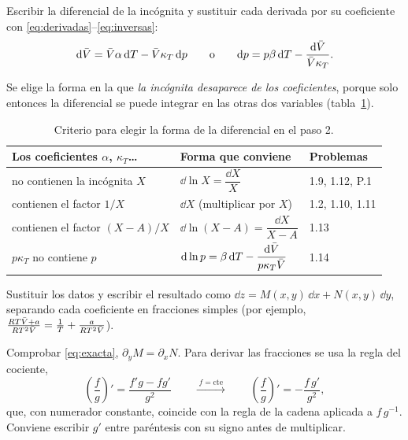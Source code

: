  Escribir la diferencial de la incógnita y sustituir cada derivada por
su coeficiente con \eqref{eq:derivadas}--\eqref{eq:inversas}:
\[
  \mathrm{d}\bar{V}=\bar{V}\alpha\,\mathrm{d} T-\bar{V}\kappa_T\,\mathrm{d} p\qquad\text{o}\qquad
  \mathrm{d} p=p\beta\,\mathrm{d} T-\frac{\mathrm{d}\bar{V}}{\bar{V}\kappa_T}.
\]

 Se elige la forma en la que \emph{la incógnita desaparece de los
coeficientes}, porque solo entonces la diferencial se puede integrar en las otras dos variables
(tabla~\ref{tab:forma}).

\begin{table}[htbp]
\centering
\caption{Criterio para elegir la forma de la diferencial en el paso 2.}
\label{tab:forma}
\small
\renewcommand{\arraystretch}{1.6}
\begin{tabular}{lll}
\toprule
Los coeficientes $\alpha$, $\kappa_T$\dots & Forma que conviene & Problemas\\
\midrule
no contienen la incógnita $X$ & $\dd\ln X=\dfrac{\dd X}{X}$ & 1.9, 1.12, P.1\\[4pt]
contienen el factor $1/X$ & $\dd X$ (multiplicar por $X$) & 1.2, 1.10, 1.11\\[4pt]
contienen el factor $(X-A)/X$ & $\dd\ln(X-A)=\dfrac{\dd X}{X-A}$ & 1.13\\[4pt]
$p\kappa_T$ no contiene $p$ & $\mathrm{d}\ln p=\beta\,\mathrm{d} T-\dfrac{\mathrm{d}\bar{V}}{p\kappa_T\bar{V}}$ & 1.14\\
\bottomrule
\end{tabular}
\end{table}

 Sustituir los datos y escribir el resultado como
$\dd z=M(x,y)\,\dd x+N(x,y)\,\dd y$, separando cada coeficiente en fracciones simples
(por ejemplo, $\frac{RT\bar{V}+a}{RT^2\bar{V}}=\frac1T+\frac{a}{RT^2\bar{V}}$).

 Comprobar \eqref{eq:exacta}, $\partial_yM=\partial_xN$. Para derivar las
fracciones se usa la regla del cociente,
\begin{equation}\label{eq:cociente}
  \left(\frac fg\right)'=\frac{f'g-fg'}{g^2}
  \qquad\xrightarrow{\;f=\text{cte}\;}\qquad
  \left(\frac fg\right)'=-\frac{f\,g'}{g^2},
\end{equation}
que, con numerador constante, coincide con la regla de la cadena aplicada a $f\,g^{-1}$. Conviene
escribir $g'$ entre paréntesis con su signo antes de multiplicar.

